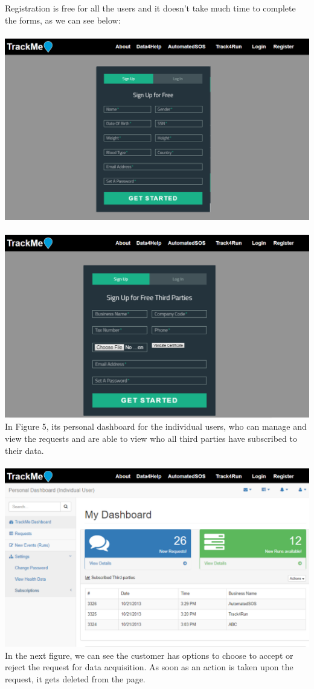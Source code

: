 \documentclass[12pt]{article}
\begin{document}
Registration is free for all the users and it doesn't take much time to complete the forms, as we can see below:\\\\
\includegraphics[scale=0.6]{../Assets/Register.png}\\\\
\includegraphics[scale=0.6]{../Assets/Register_third_party.png}\\
In Figure 5, its personal dashboard for the individual users, who can manage and view the requests and are able to view who all third parties have subscribed to their data.\\\\
\includegraphics[scale=0.6]{../Assets/Dashboard_individual.png}\\
In the next figure, we can see the customer has options to choose to accept or reject the request for data acquisition. As soon as an action is taken upon the request, it gets deleted from the page.\\
\end{document}
